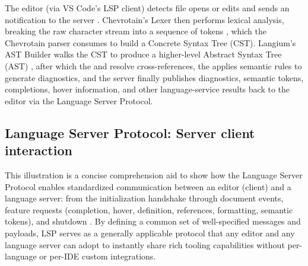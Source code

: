 The editor (via VS Code's LSP client) detects file opens or edits and sends an  notification to the server \cite{vscode-lsp}. Chevrotain's Lexer then performs lexical analysis,
breaking the raw character stream into a sequence of tokens \cite{chevrotain-docs}, which the Chevrotain parser consumes to build a Concrete Syntax Tree (CST). Langium's AST Builder walks the CST to produce
a higher-level Abstract Syntax Tree (AST) \cite{langium-doc-lifecycle}, after which the  and  resolve cross-references, the  applies semantic rules
to generate diagnostics, and the server finally publishes diagnostics, semantic tokens, completions, hover information, and other language-service results back to the editor via the
Language Server Protocol.

\subsection*{Language Server Protocol: Server client interaction}

This illustration is a concise comprehension aid to show how the Language Server Protocol enables standardized communication between an editor (client) and a language server:
from the initialization handshake through document events, feature requests (completion, hover, definition, references, formatting, semantic tokens), and shutdown \cite{lspFeatures}.
By defining a common set of well-specified messages and payloads, LSP serves as a generally applicable protocol that any editor and any language server can adopt to instantly
share rich tooling capabilities without per-language or per-IDE custom integrations.

